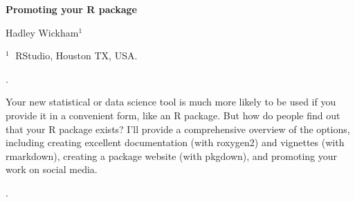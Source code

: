 \documentclass[12pt]{article}
\begin{document}
\begin{flushleft}


{\LARGE\bf Promoting your R package}


\vspace{1.0cm}

Hadley Wickham$^1$

\begin{description}

\item $^1 \;$ RStudio, Houston TX, USA.

\end{description}

\end{flushleft}


\vspace{0.75cm}

.

Your new statistical or data science tool is much more likely to be used if you provide it in a convenient form, like an R package. But how do people find out that your R package exists? I'll provide a comprehensive overview of the options, including creating excellent documentation (with roxygen2) and vignettes (with rmarkdown), creating a package website (with pkgdown), and promoting your work on social media.


\vskip 2mm

.


%
%
%
\end{document}
